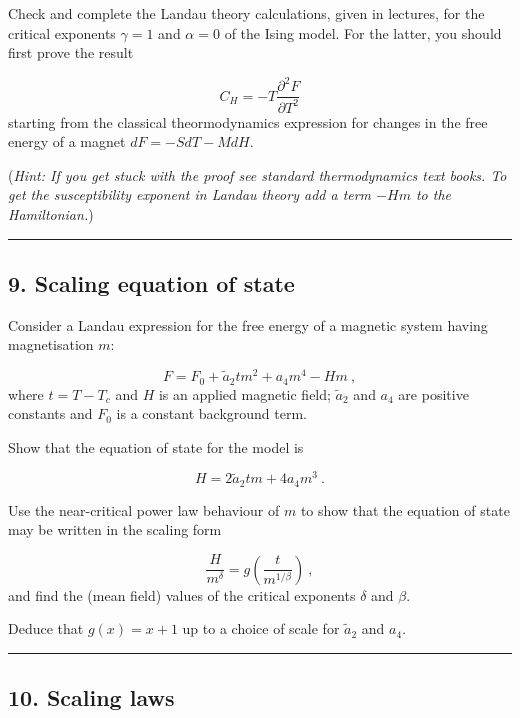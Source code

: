 \documentclass[
  letterpaper,
  enabledeprecatedfontcommands]{report}
\begin{document}
Check and complete the Landau theory calculations, given in lectures,
for the critical exponents \(\gamma=1\) and \(\alpha=0\) of the Ising
model. For the latter, you should first prove the result

\[C_H =-T\frac{\partial^2 F}{\partial T^2}\] starting from the classical
theormodynamics expression for changes in the free energy of a magnet
\(dF=-SdT-MdH\).

(\emph{Hint: If you get stuck with the proof see standard thermodynamics
text books. To get the susceptibility exponent in Landau theory add a
term \(-Hm\) to the Hamiltonian.})

\begin{center}\rule{0.5\linewidth}{0.5pt}\end{center}

\subsection*{9. Scaling equation of
state}\label{scaling-equation-of-state}

Consider a Landau expression for the free energy of a magnetic system
having magnetisation \(m\):

\[
F=F_0+\tilde{a}_2tm^2+a_4m^4-Hm\:,
\] where \(t=T-T_c\) and \(H\) is an applied magnetic field;
\(\tilde{a}_2\) and \(a_4\) are positive constants and \(F_0\) is a
constant background term.

Show that the equation of state for the model is

\[
H=2\tilde{a}_2tm+4a_4m^3\:.
\]

Use the near-critical power law behaviour of \(m\) to show that the
equation of state may be written in the scaling form

\[
\frac{H}{m^\delta}=g\left(\frac{t}{m^{1/\beta}}\right)\:,
\] and find the (mean field) values of the critical exponents \(\delta\)
and \(\beta\).

Deduce that \(g(x)=x+1\) up to a choice of scale for \(\tilde{a}_2\) and
\(a_4\).

\begin{center}\rule{0.5\linewidth}{0.5pt}\end{center}

\subsection*{10. Scaling laws}\label{scaling-laws}
\end{document}
